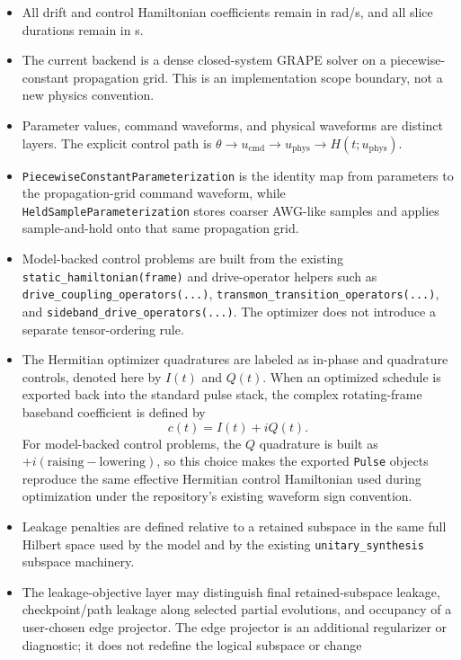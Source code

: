 \documentclass[11pt]{article}
\begin{document}
\begin{itemize}[leftmargin=1.5em]
  \item All drift and control Hamiltonian coefficients remain in rad/s, and all
  slice durations remain in s.
  \item The current backend is a dense closed-system GRAPE solver on a
  piecewise-constant propagation grid. This is an implementation scope boundary,
  not a new physics convention.
  \item Parameter values, command waveforms, and physical waveforms are distinct
  layers. The explicit control path is
  \(\theta \rightarrow u_{\mathrm{cmd}} \rightarrow u_{\mathrm{phys}} \rightarrow H(t; u_{\mathrm{phys}})\).
  \item \texttt{PiecewiseConstantParameterization} is the identity map from
  parameters to the propagation-grid command waveform, while
  \texttt{HeldSampleParameterization} stores coarser AWG-like samples and applies
  sample-and-hold onto that same propagation grid.
  \item Model-backed control problems are built from the existing
  \texttt{static\_hamiltonian(frame)} and drive-operator helpers such as
  \texttt{drive\_coupling\_operators(...)},
  \texttt{transmon\_transition\_operators(...)}, and
  \texttt{sideband\_drive\_operators(...)}. The optimizer does not introduce a
  separate tensor-ordering rule.
  \item The Hermitian optimizer quadratures are labeled as in-phase and quadrature
  controls, denoted here by \(I(t)\) and \(Q(t)\). When an optimized schedule is
  exported back into the standard pulse stack, the complex rotating-frame baseband
  coefficient is defined by
  \[
  c(t) = I(t) + i Q(t).
  \]
  For model-backed control problems, the \(Q\) quadrature is built as
  \( +i(\mathrm{raising} - \mathrm{lowering}) \), so this choice makes the
  exported \texttt{Pulse} objects reproduce the same effective Hermitian control
  Hamiltonian used during optimization under the repository's existing waveform
  sign convention.
  \item Leakage penalties are defined relative to a retained subspace in the same
  full Hilbert space used by the model and by the existing
  \texttt{unitary\_synthesis} subspace machinery.
  \item The leakage-objective layer may distinguish final retained-subspace
  leakage, checkpoint/path leakage along selected partial evolutions, and
  occupancy of a user-chosen edge projector. The edge projector is an additional
  regularizer or diagnostic; it does not redefine the logical subspace or change

\end{itemize}
\end{document}
